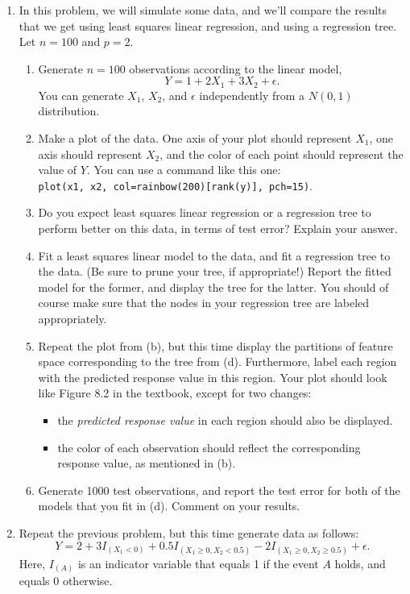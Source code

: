 \documentclass[12pt]{article}
\begin{document}
\begin{enumerate}
\item In this problem, we will simulate some data, and we'll compare the results that we get using least squares linear regression, and using a regression tree. Let $n=100$ and $p=2$.
 \begin{enumerate}
 \item Generate $n=100$ observations according to the linear model, $$Y=1 + 2 X_1 + 3 X_2 + \epsilon.$$ 
 You can generate $X_1$, $X_2$, and $\epsilon$ independently from a $N(0,1)$ distribution.
 \item Make a plot of the data. One axis of your plot should represent $X_1$, one axis should represent $X_2$, and the color of each point should represent the value of $Y$. 
 You can use a command like this one:\\
   \verb+plot(x1, x2, col=rainbow(200)[rank(y)], pch=15)+.
 \item Do you expect least squares linear regression or a regression tree to perform better on this data, in terms of test error? Explain your answer.
 \item Fit a least squares linear model to the data, and fit a regression tree to the data. (Be sure to prune your tree, if appropriate!) Report the fitted model for the former, and display the tree for the latter. You should of course make sure that the nodes in your regression tree are labeled appropriately.
 \item Repeat the plot from (b), but this time display the partitions of feature space corresponding to the tree from (d). Furthermore, label each region with the predicted response value in this region. Your plot should look like Figure 8.2 in the textbook, except for two changes:
 \begin{itemize}
 \item the \emph{predicted response value} in each region should also be displayed. 
 \item the color of each observation should reflect the corresponding response value, as mentioned in (b).
 \end{itemize}
 \item Generate 1000 test observations, and  report the test error for both of the models that you fit in (d).  Comment on your results.
 \end{enumerate}
 

 \item Repeat the previous problem, but this time generate data as follows:
 $$Y = 2 + 3 I_{\left(X_1 < 0 \right)} + 0.5 I_{\left( X_1 \geq 0, X_2<0.5 \right)} - 2 I_{\left( X_1 \geq 0,  X_2 \geq 0.5 \right)} + \epsilon.$$
Here,  $I_{(A)}$ is an indicator variable that equals 1 if the event $A$ holds, and equals 0 otherwise.




\end{enumerate}
\end{document}
